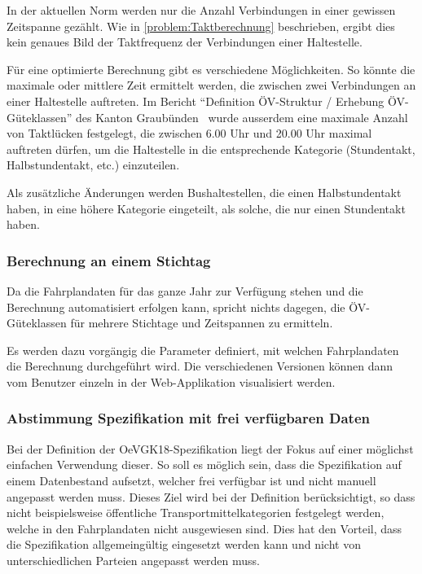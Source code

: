 In der aktuellen Norm werden nur die Anzahl Verbindungen in einer gewissen Zeitspanne gezählt.
Wie in \ref{problem:Taktberechnung} beschrieben, ergibt dies kein genaues Bild der Taktfrequenz der Verbindungen einer Haltestelle.

Für eine optimierte Berechnung gibt es verschiedene Möglichkeiten.
So könnte die maximale oder mittlere Zeit ermittelt werden, die zwischen zwei Verbindungen an einer Haltestelle auftreten.
Im Bericht "`Definition ÖV-Struktur / Erhebung ÖV-Güteklassen"' des Kanton Graubünden~\cite{oev-guteklasse-gr} wurde ausserdem eine maximale Anzahl von Taktlücken festgelegt, die zwischen 6.00 Uhr und 20.00 Uhr maximal auftreten dürfen, um die Haltestelle in die entsprechende Kategorie (Stundentakt, Halbstundentakt, etc.) einzuteilen.

Als zusätzliche Änderungen werden Bushaltestellen, die einen Halbstundentakt haben, in eine höhere Kategorie eingeteilt, als solche, die nur einen Stundentakt haben.


\subsubsection{Berechnung an einem Stichtag}
\label{solution:Berechnung an einem Stichtag}

Da die Fahrplandaten für das ganze Jahr zur Verfügung stehen und die Berechnung automatisiert erfolgen kann, spricht nichts dagegen, die \acs{ÖV}-Güteklassen für mehrere Stichtage und Zeitspannen zu ermitteln.

Es werden dazu vorgängig die Parameter definiert, mit welchen Fahrplandaten die Berechnung durchgeführt wird.
Die verschiedenen Versionen können dann vom Benutzer einzeln in der Web-Applikation visualisiert werden.

\subsubsection{Abstimmung Spezifikation mit frei verfügbaren Daten}
\label{solution:Abstimmung Spezifikation mit frei verfügbaren Daten}

Bei der Definition der \gls{OeVGK18}-Spezifikation liegt der Fokus auf einer möglichst einfachen Verwendung dieser. 
So soll es möglich sein, dass die Spezifikation auf einem Datenbestand aufsetzt, welcher frei verfügbar ist und nicht manuell angepasst werden muss.
Dieses Ziel wird bei der Definition berücksichtigt, so dass nicht beispielsweise öffentliche Transportmittelkategorien festgelegt werden, welche in den Fahrplandaten nicht ausgewiesen sind.
Dies hat den Vorteil, dass die Spezifikation allgemeingültig eingesetzt werden kann und nicht von unterschiedlichen Parteien angepasst werden muss.

